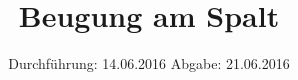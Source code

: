
\subject{406}
\title{Beugung am Spalt}
\date{
  Durchführung: 14.06.2016
  \hspace{3em}
  Abgabe: 21.06.2016
}



\maketitle
\newpage
\mbox{}
\newpage
\thispagestyle{empty}
\tableofcontents
\newpage






\nocite{numpy}
\nocite{matplotlib}
\nocite{uncertainties}
\printbibliography


